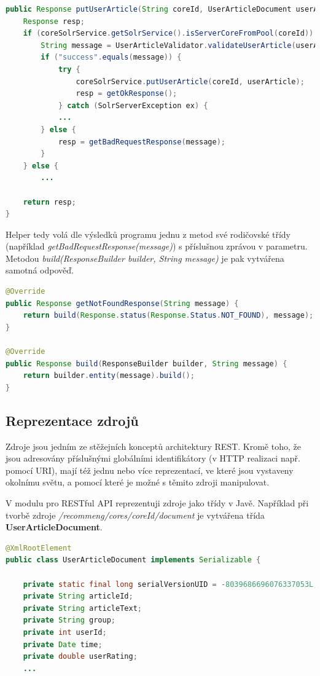 \documentclass[thesis=M,czech]{FITthesis}[2014/05/07]
\begin{document}
\begin{lstlisting}[language=java]
public Response putUserArticle(String coreId, UserArticleDocument userArticle) {
    Response resp;
    if (coreSolrService.getSolrService().isServerCoreFromPool(coreId)) {
        String message = UserArticleValidator.validateUserArticle(userArticle);
        if ("success".equals(message)) {
            try {
                coreSolrService.putUserArticle(coreId, userArticle);
                resp = getOkResponse();
            } catch (SolrServerException ex) {
			...
        } else {
            resp = getBadRequestResponse(message);
        }
    } else {
        ...

    return resp;
}
\end{lstlisting}

Helper tedy volá dle výsledků programu jednu z metod své rodičovské třídy (například \emph{getBadRequestResponse(message)}) s příslušnou zprávou v parametru. Metodou \emph{build(ResponseBuilder builder, String message)} je pak vytvářena samotná odpověď.

\begin{lstlisting}[language=java]
@Override
public Response getNotFoundResponse(String message) {
    return build(Response.status(Response.Status.NOT_FOUND), message);
}    

@Override
public Response build(ResponseBuilder builder, String message) {
    return builder.entity(message).build();
}
\end{lstlisting}

\subsection{Reprezentace zdrojů}
Zdroje jsou jedním ze stěžejních konceptů architektury REST. Kromě toho, že jsou adresovány příslušnými globálními identifikátory (v HTTP realizaci např. pomocí URI), mají též jednu nebo více reprezentací, ve které jsou vystaveny okolnímu světu, a pomocí které je možné s těmito zdroji manipulovat. 

V modulu pro RESTful API reprezentuji zdroje jako třídy v Javě. Například při tvorbě zdroje \emph{/recommeng/cores/{coreId}/document} je vytvářena třída \textbf{UserArticleDocument}. 

\begin{lstlisting}[language=java]
@XmlRootElement
public class UserArticleDocument implements Serializable {       
    
    private static final long serialVersionUID = -8039686696076337053L;    
    private String articleId;
    private String articleText;
    private String group;
    private int userId;    
    private Date time;    
    private double userRating;
    ...
\end{lstlisting}
\end{document}
